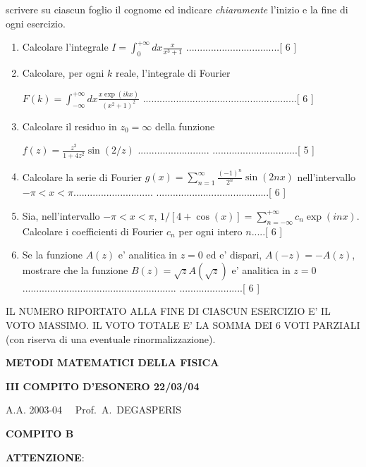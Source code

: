 \documentclass[,12pt]{article}
\begin{document}
\noindent
scrivere su ciascun foglio il cognome ed indicare
\emph{chiaramente} l'inizio e la fine di ogni esercizio.
\vspace{20pt}
\noindent
\begin{enumerate}
\item Calcolare l'integrale $I=\int_0^{+\infty}dx\frac{x}{x^3+1}$
..................................[ 6 ] 
\item Calcolare, per ogni $k$ reale, l'integrale di Fourier
 
$F(k)=\int_{-\infty}^{+\infty}dx\frac{x\exp(ikx)}{(x^2+1)^2}$
........................................................[ 6 ]
\item Calcolare il residuo in $z_0=\infty$ della funzione

$f(z)=\frac{z^2}{1+4z^2} \sin(2/z)$ ..........................
...............................[ 5 ]  
\item Calcolare la serie di Fourier 
$g(x)=\sum_{n=1}^{\infty} \frac{(-1)^n}{2^n}\sin(2nx)$
nell'intervallo $-\pi<x<\pi$.............................
.........................................[ 6 ]
\item Sia, nell'intervallo $-\pi<x<\pi$, $1/[4+\cos(x)
]=\sum_{n=-\infty}^{+\infty} c_n \exp(inx)$. Calcolare i coefficienti di
Fourier $c_n$ per ogni intero $n$.....[ 6 ]
\item Se la funzione $A(z)$ e' analitica in $z=0$ ed e' dispari,
$A(-z)=-A(z)$, mostrare che la funzione $B(z)=\sqrt zA(\sqrt z)$ e'
analitica in
$z=0$........................................................
.......................[ 6 ]

\end{enumerate}

\noindent IL NUMERO RIPORTATO ALLA FINE DI CIASCUN ESERCIZIO
E' IL VOTO MASSIMO. IL VOTO TOTALE E' LA SOMMA DEI 6 VOTI
PARZIALI (con riserva di una eventuale rinormalizzazione).

\newpage

\centerline{\bf{METODI MATEMATICI DELLA FISICA}}

\centerline{\bf{III COMPITO D'ESONERO 22/03/04}}

\centerline{A.A. 2003-04 \ \ Prof.\ A.\ DEGASPERIS}
\centerline{\bf{COMPITO  B}}
\vspace{20pt}
\noindent
{\bf ATTENZIONE}:
\end{document}
